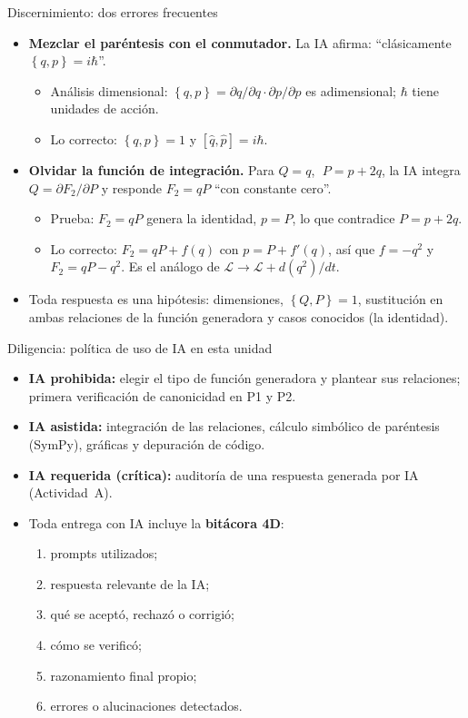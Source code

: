 \documentclass[spanish]{beamer}
\newcommand{\Lag}{\mathcal{L}}               %
\newcommand{\pb}[2]{\left\{#1,#2\right\}}    %
\begin{document}
\begin{frame}{\alert{Discernimiento}: dos errores frecuentes}
\begin{itemize}[<+->]
  \item \textbf{Mezclar el paréntesis con el conmutador.} La IA afirma:
        “clásicamente $\pb{q}{p}=i\hbar$”.
        \begin{itemize}
          \item Análisis dimensional: $\pb{q}{p}=\partial q/\partial q\cdot\partial p/\partial p$
                es adimensional; $\hbar$ tiene unidades de acción.
          \item Lo correcto: $\pb{q}{p}=1$ y $[\hat q,\hat p]=i\hbar$.
        \end{itemize}
  \item \textbf{Olvidar la función de integración.} Para $Q=q$, $\;P=p+2q$, la IA integra
        $Q=\partial F_2/\partial P$ y responde $F_2=qP$ “con constante cero”.
        \begin{itemize}
          \item Prueba: $F_2=qP$ genera la identidad, $p=P$, lo que contradice $P=p+2q$.
          \item Lo correcto: $F_2=qP+f(q)$ con $p=P+f'(q)$, así que $f=-q^2$ y
                $F_2=qP-q^2$. Es el análogo de $\Lag\to\Lag+d(q^2)/dt$.
        \end{itemize}
  \item Toda respuesta es una hipótesis: dimensiones, $\pb{Q}{P}=1$, sustitución en
        ambas relaciones de la función generadora y casos conocidos (la identidad).
\end{itemize}
\end{frame}

\begin{frame}{\alert{Diligencia}: política de uso de IA en esta unidad}
\begin{itemize}[<+->]
  \item \textbf{IA prohibida:} elegir el tipo de función generadora y plantear sus
        relaciones; primera verificación de canonicidad en P1 y P2.
  \item \textbf{IA asistida:} integración de las relaciones, cálculo simbólico de
        paréntesis (SymPy), gráficas y depuración de código.
  \item \textbf{IA requerida (crítica):} auditoría de una respuesta generada por IA
        (Actividad~A).
  \item Toda entrega con IA incluye la \textbf{bitácora 4D}:
        \begin{enumerate}
          \item prompts utilizados;
          \item respuesta relevante de la IA;
          \item qué se aceptó, rechazó o corrigió;
          \item cómo se verificó;
          \item razonamiento final propio;
          \item errores o alucinaciones detectados.
        \end{enumerate}
\end{itemize}
\end{frame}
\end{document}
